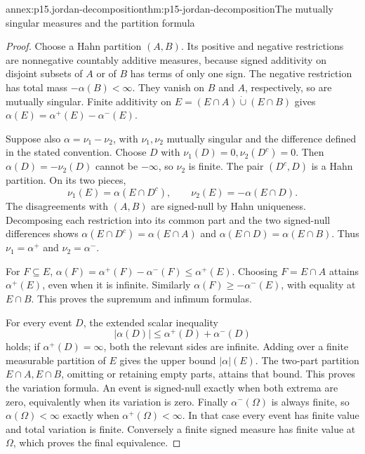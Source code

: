\begin{annexitem}{annex:p15.jordan-decomposition}{thm:p15-jordan-decomposition}{The mutually singular measures and the partition formula}
\begin{proof}
Choose a Hahn partition \((A,B)\). Its positive and negative restrictions
are nonnegative countably additive measures, because signed additivity
on disjoint subsets of \(A\) or of \(B\) has terms of only one sign.
The negative restriction has total mass \(-\alpha(B)<\infty\).
They vanish on \(B\) and \(A\), respectively, so are mutually singular.
Finite additivity on \(E=(E\cap A)\mathbin{\dot\cup}(E\cap B)\)
gives \(\alpha(E)=\alpha^+(E)-\alpha^-(E)\).

Suppose also \(\alpha=\nu_1-\nu_2\), with \(\nu_1,\nu_2\)
mutually singular and the difference defined in the stated convention.
Choose \(D\) with \(\nu_1(D)=0,\nu_2(D^c)=0\).
Then \(\alpha(D)=-\nu_2(D)\) cannot be \(-\infty\), so \(\nu_2\)
is finite. The pair \((D^c,D)\) is a Hahn partition. On its two pieces,
\[
                   \nu_1(E)=\alpha(E\cap D^c),\qquad
                   \nu_2(E)=-\alpha(E\cap D).
\]
The disagreements with \((A,B)\) are signed-null by Hahn uniqueness.
Decomposing each restriction into its common part and the two
signed-null differences shows
\(\alpha(E\cap D^c)=\alpha(E\cap A)\) and
\(\alpha(E\cap D)=\alpha(E\cap B)\).
Thus \(\nu_1=\alpha^+\) and \(\nu_2=\alpha^-\).

For \(F\subseteq E\),
\(\alpha(F)=\alpha^+(F)-\alpha^-(F)\leq\alpha^+(E)\).
Choosing \(F=E\cap A\) attains \(\alpha^+(E)\), even when it is infinite.
Similarly \(\alpha(F)\geq-\alpha^-(E)\), with equality at \(E\cap B\).
This proves the supremum and infimum formulas.

For every event \(D\), the extended scalar inequality
\[
                         |\alpha(D)|\leq\alpha^+(D)+\alpha^-(D)
\]
holds; if \(\alpha^+(D)=\infty\), both the relevant sides are infinite.
Adding over a finite measurable partition of \(E\) gives the upper
bound \(\lvert\alpha\rvert(E)\).
The two-part partition \(E\cap A,E\cap B\), omitting or retaining
empty parts, attains that bound. This proves the variation formula.
An event is signed-null exactly when both extrema are zero, equivalently
when its variation is zero.
Finally \(\alpha^-(\Omega)\) is always finite, so
\(\alpha(\Omega)<\infty\) exactly when \(\alpha^+(\Omega)<\infty\).
In that case every event has finite value and total variation is finite.
Conversely a finite signed measure has finite value at \(\Omega\),
which proves the final equivalence.
\end{proof}
\end{annexitem}

